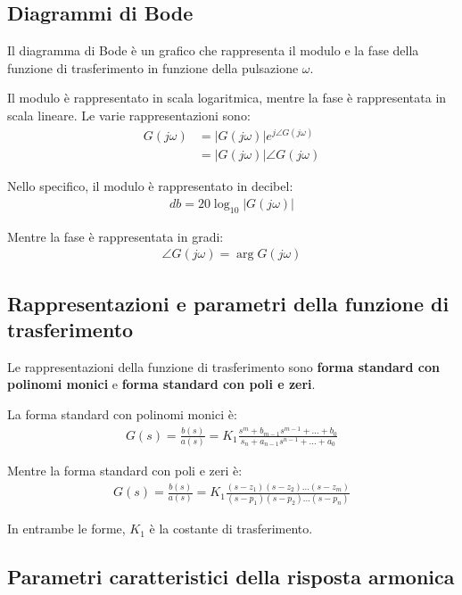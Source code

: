 \subsection{Diagrammi di Bode}
Il diagramma di Bode è un grafico che rappresenta il modulo e la fase della funzione di trasferimento
in funzione della pulsazione $\omega$.

Il modulo è rappresentato in scala logaritmica, mentre la fase è rappresentata in scala lineare.
Le varie rappresentazioni sono:
\begin{align}
    G(j\omega) &= | G(j\omega) | e^{j \angle G(j\omega)} \\
    &= | G(j\omega) | \angle G(j\omega)
\end{align}

Nello specifico, il modulo è rappresentato in decibel:
\begin{align}
    db = 20 \log_{10} | G(j\omega) |
\end{align}

Mentre la fase è rappresentata in gradi:
\begin{align}
    \angle G(j\omega) = \arg G(j\omega)
\end{align}


\subsection{Rappresentazioni e parametri della funzione di trasferimento}
Le rappresentazioni della funzione di trasferimento sono \textbf{forma standard con polinomi monici} e  
\textbf{forma standard con poli e zeri}.

La forma standard con polinomi monici è:
\begin{align}
    G(s) = \frac{b(s)}{a(s)} = K_1 \frac{s^m + b_{m-1} s^{m-1} + \dots + b_0}{s_n + a_{n-1} s^{n-1} + \dots + a_0}
\end{align}

Mentre la forma standard con poli e zeri è:
\begin{align}
    G(s) = \frac{b(s)}{a(s)} = K_1 \frac{(s - z_1)(s-z_2) \dots (s-z_m)}{(s-p_1)(s-p_2) \dots (s-p_n)}
\end{align}

In entrambe le forme, $K_1$ è la costante di trasferimento.


\subsection{Parametri caratteristici della risposta armonica}


